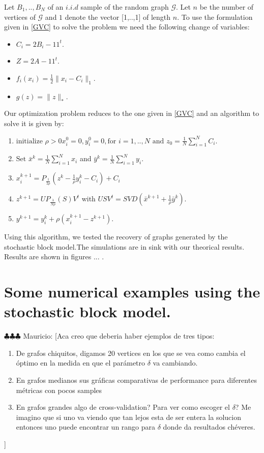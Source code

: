\documentclass[12pt]{amsart}
\theoremstyle{remark}
\newcommand{\grG}{{\mathcal{G}}}
\newcommand{\mv}[1]{{\color{red} \sf $\clubsuit\clubsuit\clubsuit$ Mauricio: [#1]}}
\begin{document}
Let $B_1,..,B_N$ of an $i.i.d$ sample of the random graph $\grG$. Let $n$ be the number of vertices of $\grG$ and $1$ denote the vector [1,..,1] of length $n$. To use the formulation given in \ref{GVC} to solve the problem we need the following change of variables:


\begin{itemize}
\item $C_i = 2B_i-11^t$.
\item $Z = 2A-11^t$.
\item $f_i(x_i) = \frac{1}{2}\|x_i-C_i\|_1$.
\item $g(z)=\|z\|_*$.
\end{itemize}

Our optimization problem reduces to the one given in \ref{GVC} and an algorithm to solve it is given by:

\begin{enumerate}
\item $\text{initialize } \rho >0 x_i^0=0, y_i^0=0, \text{for } i=1,..,N \text{ and } z_0= \frac{1}{N}\sum_{i=1}^N C_i$.
\item $ \text{Set } \bar{x}^{k} = \frac{1}{N}\sum_{i=1}^N x_i $ and $\bar{y}^{k} = \frac{1}{N}\sum_{i=1}^N y_i $.
\item $x_i^{k+1}=P_{\frac{1}{2\rho}}(z^k-\frac{1}{\rho}y_i^k-C_i)+C_i$
\item $z^{k+1} = UP_{\frac{\lambda}{N\rho}}(S)V^t$ with $USV^t = SVD(\bar{x}^{k+1}+\frac{1}{\rho}\bar{y}^k)$.
\item $y^{k+1} =y_i^k + \rho(x_i^{k+1}-z^{k+1}). $ 

\end{enumerate}


Using this algorithm, we tested the recovery of graphs generated by the stochastic block model.The simulations are in sink with our theorical results.  Results are shown in figures ... .



\section{Some numerical examples using the stochastic block model.}
\label{Numerics}
\mv{Aca creo que deberia haber ejemplos de tres tipos:
\begin{enumerate}
\item De grafos chiquitos, digamos 20 vertices en los que se vea como cambia el \'optimo en la medida en que el par\'ametro $\delta$ va cambiando.
\item En grafos medianos sus gr\'aficas comparativas de performance para diferentes m\'etricas con pocos samples
\item En grafos grandes algo de cross-validation? Para ver como escoger el $\delta$? Me imagino que si uno va viendo que tan lejos esta de ser entera la solucion entonces uno puede encontrar un rango para $\delta$ donde da resultados ch\'everes.
\end{enumerate}

}





\end{document}
